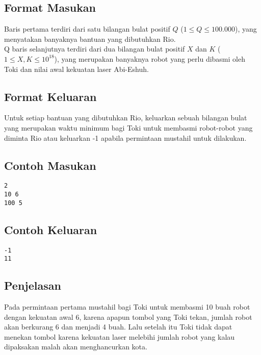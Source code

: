 \documentclass{article}
\begin{document}
\subsection*{Format Masukan}

Baris pertama terdiri dari satu bilangan bulat positif $Q$ ($1 \leq Q \leq 100.000$), yang menyatakan banyaknya bantuan yang dibutuhkan Rio.\\
Q baris selanjutnya terdiri dari dua bilangan bulat positif $X$ dan $K$ ($1 \leq X, K \leq 10^{18}$), yang merupakan banyaknya robot yang perlu dibasmi oleh Toki dan nilai awal kekuatan laser Abi-Eshuh.

\subsection*{Format Keluaran}

Untuk setiap bantuan yang dibutuhkan Rio, keluarkan sebuah bilangan bulat yang merupakan waktu minimum bagi Toki untuk membasmi robot-robot yang diminta Rio atau keluarkan -1 apabila permintaan mustahil untuk dilakukan.

\begin{multicols}{2}
\subsection*{Contoh Masukan}
\begin{lstlisting}
2
10 6
100 5
\end{lstlisting}
\columnbreak
\subsection*{Contoh Keluaran}
\begin{lstlisting}
-1
11
\end{lstlisting}
\vfill
\null
\end{multicols}

\subsection*{Penjelasan}
Pada permintaan pertama mustahil bagi Toki untuk membasmi 10 buah robot dengan kekuatan awal 6, karena apapun tombol yang Toki tekan, jumlah robot akan berkurang 6 dan menjadi 4 buah. Lalu setelah itu Toki tidak dapat menekan tombol karena kekuatan laser melebihi jumlah robot yang kalau dipaksakan malah akan menghancurkan kota.
\end{document}
